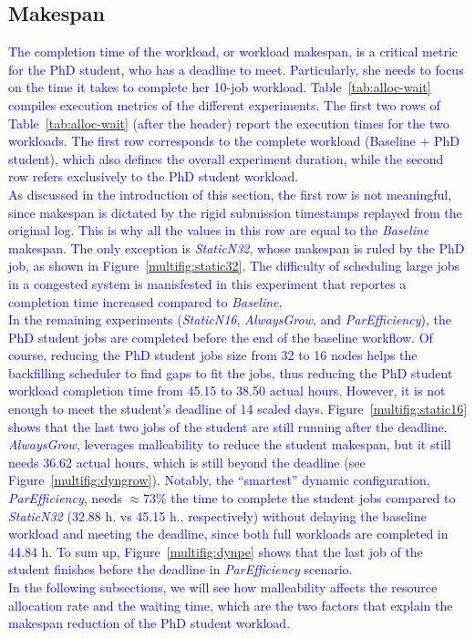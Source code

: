 \documentclass[a4paper,fleqn]{cas-dc}
\newcommand{\review}[1]{\textcolor{blue}{#1}}
\begin{document}
\subsection{Makespan}\label{subsec:makespan}
\review{
The completion time of the workload, or workload makespan, is a critical metric for the PhD student, who has a deadline to meet.
Particularly, she needs to focus on the time it takes to complete her 10-job workload.
Table~\ref{tab:alloc-wait} compiles execution metrics of the different experiments.
The first two rows of Table~\ref{tab:alloc-wait} (after the header) report the execution times for the two workloads. The first row corresponds to the complete workload (Baseline + PhD student), which also defines the overall experiment duration, while the second row refers exclusively to the PhD student workload.
\\\indent
As discussed in the introduction of this section, the first row is not meaningful, since makespan is dictated by the rigid submission timestamps replayed from the original log.
This is why all the values in this row are equal to the \textit{Baseline} makespan.
The only exception is \textit{StaticN32}, whose makespan is ruled by the PhD job, as shown in Figure~\ref{multifig:static32}.
The difficulty of scheduling large jobs in a congested system is manisfested in this experiment that reportes a completion time increased compared to \textit{Baseline}.
\\\indent
In the remaining experiments (\textit{StaticN16}, \textit{AlwaysGrow}, and \textit{ParEfficiency}), the PhD student jobs are completed before the end of the baseline workflow.
Of course, reducing the PhD student jobs size from 32 to 16 nodes helps the backfilling scheduler to find gaps to fit the jobs, thus reducing the PhD student workload completion time from 45.15 to 38.50 actual hours.
However, it is not enough to meet the student's deadline of 14 scaled days.
Figure~\ref{multifig:static16} shows that the last two jobs of the student are still running after the deadline.
\textit{AlwaysGrow}, leverages malleability to reduce the student makespan, but it still needs 36.62 actual hours, which is still beyond the deadline (see Figure~\ref{multifig:dyngrow}).
Notably, the ``smartest'' dynamic configuration, \textit{ParEfficiency}, needs $\approx73\%$ the time to complete the student jobs compared to \textit{StaticN32} (32.88 h. vs 45.15 h., respectively) without delaying the baseline workload and meeting the deadline, since both full workloads are completed in 44.84 h.
To sum up, Figure~\ref{multifig:dynpe} shows that the last job of the student finishes before the deadline in \textit{ParEfficiency} scenario.
\\\indent
In the following subsections, we will see how malleability affects the resource allocation rate and the waiting time, which are the two factors that explain the makespan reduction of the PhD student workload.
}
\end{document}

